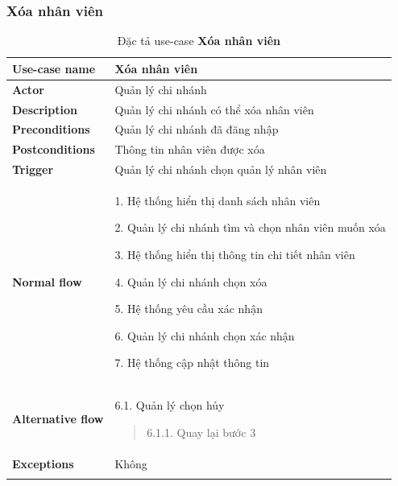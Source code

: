 \subsubsection{Xóa nhân viên}
{
    \setlength\extrarowheight{6pt}
    \begin{longtable}{| p{} | p{} |}
        \hline
        \textbf{Use-case name}
         &
        Xóa nhân viên
        \\
        \hline
        \textbf{Actor}
         &
        Quản lý chi nhánh
        \\
        \hline
        \textbf{Description}
         &
        Quản lý chi nhánh có thể xóa nhân viên
        \\
        \hline
        \textbf{Preconditions}
         &
        Quản lý chi nhánh đã đăng nhập
        \\
        \hline
        \textbf{Postconditions}
         &
        Thông tin nhân viên được xóa
        \\
        \hline
        \textbf{Trigger}
         &
        Quản lý chi nhánh chọn quản lý nhân viên
        \\
        \hline
        \begin{flushleft}
            \textbf{Normal flow}
        \end{flushleft}
         &
        1. Hệ thống hiển thị danh sách nhân viên

        2. Quản lý chi nhánh tìm và chọn nhân viên muốn xóa

        3. Hệ thống hiển thị thông tin chi tiết nhân viên

        4. Quản lý chi nhánh chọn xóa

        5. Hệ thống yêu cầu xác nhận

        6. Quản lý chi nhánh chọn xác nhận

        7. Hệ thống cập nhật thông tin
        \\
        \hline
        \textbf{Alternative flow}
         &
        6.1. Quản lý chọn hủy
        \begin{quote}
            6.1.1. Quay lại bước 3
        \end{quote}
        \\
        \hline
        \textbf{Exceptions}
         &
        Không
        \\
        \hline
        \caption{Đặc tả use-case \textbf{Xóa nhân viên}}
    \end{longtable}
}


